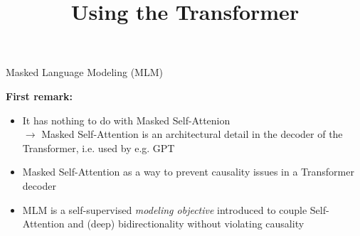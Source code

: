 



\newcommand{\titlefigure}{figure/bert.jpeg}
\newcommand{\learninggoals}{
\item Understand the two pre-training tasks
\item Learn how samples are constructed
\item Understand the pre-training process
\item Understand the fine-tuning procedure
\item Learn the differences between token- and sequence classification}

\title{Using the Transformer}
\date{}




\begin{frame}{Masked Language Modeling (MLM)}

\vfill

\textbf{First remark:}

\begin{itemize}
	\item It has nothing to do with Masked Self-Attenion\\ 
				$\rightarrow$ Masked Self-Attention is an architectural detail in the decoder of the Transformer, i.e. used by e.g. GPT
	\item Masked Self-Attention as a way to prevent causality issues in a Transformer decoder
	\item MLM is a self-supervised \textit{modeling objective} introduced to couple Self-Attention and (deep) bidirectionality without violating causality
\end{itemize}

\vfill

\end{frame}


